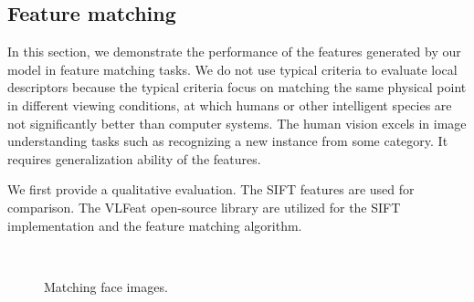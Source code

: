 \documentclass[twocolumn]{article}
\begin{document}
\subsection{Feature matching}

In this section, we demonstrate the performance of the features generated by our model in feature matching tasks.
We do not use typical criteria to evaluate local descriptors \cite{mikolajczyk2005}
because the typical criteria focus on matching the same physical point in different viewing conditions,
at which humans or other intelligent species are not significantly better than computer systems.
The human vision excels in image understanding tasks such as recognizing a new instance from some category.
It requires generalization ability of the features.

We first provide a qualitative evaluation.
The SIFT features \cite{lowe1999} are used for comparison.
The VLFeat open-source library \cite{vedaldi2010} are utilized for the SIFT implementation and the feature matching algorithm.

\begin{figure}[!t]
\centering
  \\
\caption{Matching face images.}
\label{fig:11}
\end{figure}
\end{document}
